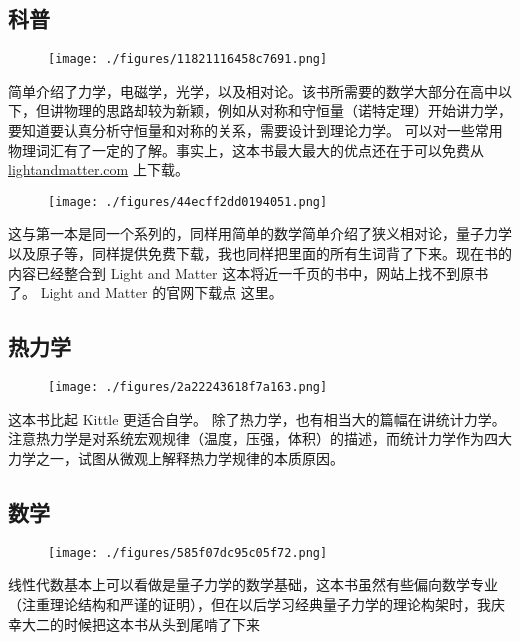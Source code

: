 
\begin{issues}
\issueDraft
\end{issues}

\subsection{科普}
\begin{figure}[ht]
\centering
\texttt{[image: ./figures/11821116458c7691.png]}
\caption{} \label{fig_PhText_4}
\end{figure}
简单介绍了力学，电磁学，光学，以及相对论。该书所需要的数学大部分在高中以下，但讲物理的思路却较为新颖，例如从对称和守恒量（诺特定理）开始讲力学，要知道要认真分析守恒量和对称的关系，需要设计到理论力学。 可以对一些常用物理词汇有了一定的了解。事实上，这本书最大最大的优点还在于可以免费从 \href{https://lightandmatter.com/}{lightandmatter.com} 上下载。

\begin{figure}[ht]
\centering
\texttt{[image: ./figures/44ecff2dd0194051.png]}
\caption{} \label{fig_PhText_9}
\end{figure}
这与第一本是同一个系列的，同样用简单的数学简单介绍了狭义相对论，量子力学以及原子等，同样提供免费下载，我也同样把里面的所有生词背了下来。现在书的内容已经整合到 Light and Matter 这本将近一千页的书中，网站上找不到原书了。 Light and Matter 的官网下载点 这里。

\subsection{热力学}
\begin{figure}[ht]
\centering
\texttt{[image: ./figures/2a22243618f7a163.png]}
\caption{} \label{fig_PhText_1}
\end{figure}
这本书比起 Kittle 更适合自学。 除了热力学，也有相当大的篇幅在讲统计力学。注意热力学是对系统宏观规律（温度，压强，体积）的描述，而统计力学作为四大力学之一，试图从微观上解释热力学规律的本质原因。

\subsection{数学}

\begin{figure}[ht]
\centering
\texttt{[image: ./figures/585f07dc95c05f72.png]}
\caption{} \label{fig_PhText_7}
\end{figure}
线性代数基本上可以看做是量子力学的数学基础，这本书虽然有些偏向数学专业（注重理论结构和严谨的证明），但在以后学习经典量子力学的理论构架时，我庆幸大二的时候把这本书从头到尾啃了下来

